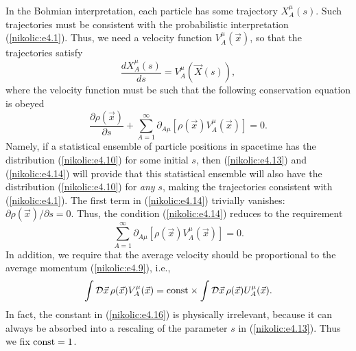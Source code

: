 \documentclass[12pt,twoside]{report} %
\begin{document}
In the Bohmian interpretation, each particle has some trajectory
$X^{\mu}_A(s)$.
Such trajectories must be consistent with the probabilistic interpretation (\ref{nikolic:e4.1}).
Thus, we need a velocity function $V^{\mu}_A(\vec{x})$, so that the trajectories
satisfy
\begin{equation}\label{nikolic:e4.13}
 \frac{dX^{\mu}_A(s)}{ds}=V^{\mu}_A(\vec{X}(s)) ,
\end{equation}
where the velocity function must be such that the following conservation equation is obeyed
\begin{equation}\label{nikolic:e4.14}
 \frac{\partial \rho(\vec{x})}{\partial s} + 
\sum_{A=1}^{\infty}\partial_{A\mu}[\rho(\vec{x}) V^{\mu}_A(\vec{x}) ] =0.
\end{equation}
Namely, if a statistical ensemble of particle positions in spacetime has the distribution 
(\ref{nikolic:e4.10}) for some initial $s$, then (\ref{nikolic:e4.13}) and (\ref{nikolic:e4.14}) will 
provide that this statistical ensemble will also have the distribution 
(\ref{nikolic:e4.10}) for {\em any} $s$, making the trajectories consistent with (\ref{nikolic:e4.1}).
The first term in (\ref{nikolic:e4.14}) trivially vanishes: $ \partial \rho(\vec{x})/\partial s =0$.
Thus, the condition (\ref{nikolic:e4.14}) reduces to the requirement
\begin{equation}\label{nikolic:e4.15} 
\sum_{A=1}^{\infty}\partial_{A\mu}[\rho(\vec{x}) V^{\mu}_A(\vec{x}) ] =0.
\end{equation}
In addition, we require that the average velocity should be proportional to the average momentum
(\ref{nikolic:e4.9}), i.e., 
\begin{equation}\label{nikolic:e4.16}
\int {\cal D}\vec{x}\, \rho(\vec{x}) V^{\mu}_A(\vec{x}) 
 = {\rm const} \times \int {\cal D}\vec{x}\, \rho(\vec{x}) U^{\mu}_A(\vec{x}) .
\end{equation} 
In fact, the constant in (\ref{nikolic:e4.16}) is physically irrelevant, because it can always be
absorbed into a rescaling of the parameter $s$ in (\ref{nikolic:e4.13}). Thus
we fix ${\rm const}=1$.
\end{document}
